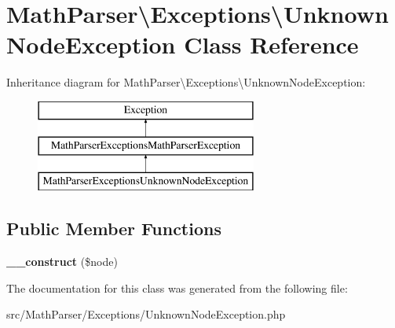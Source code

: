 \hypertarget{classMathParser_1_1Exceptions_1_1UnknownNodeException}{\section{Math\-Parser\textbackslash{}Exceptions\textbackslash{}Unknown\-Node\-Exception Class Reference}
\label{classMathParser_1_1Exceptions_1_1UnknownNodeException}
}
Inheritance diagram for Math\-Parser\textbackslash{}Exceptions\textbackslash{}Unknown\-Node\-Exception\-:\begin{figure}[H]
\begin{center}
\leavevmode
\includegraphics[height=3.000000cm]{classMathParser_1_1Exceptions_1_1UnknownNodeException}
\end{center}
\end{figure}
\subsection*{Public Member Functions}
\begin{DoxyCompactItemize}
\item 
\hypertarget{classMathParser_1_1Exceptions_1_1UnknownNodeException_a05ccf925370ac66946a0a5ebd080aff7}{{\bfseries \-\_\-\-\_\-construct} (\$node)}\label{classMathParser_1_1Exceptions_1_1UnknownNodeException_a05ccf925370ac66946a0a5ebd080aff7}

\end{DoxyCompactItemize}


The documentation for this class was generated from the following file\-:\begin{DoxyCompactItemize}
\item 
src/\-Math\-Parser/\-Exceptions/Unknown\-Node\-Exception.\-php\end{DoxyCompactItemize}
